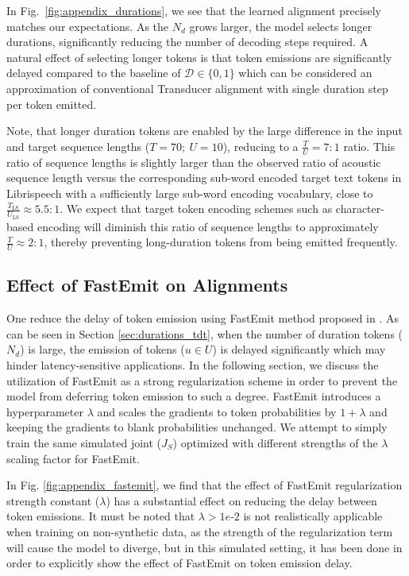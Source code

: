 \documentclass{article}
\begin{document}
In Fig.~\ref{fig:appendix_durations}, we see that the learned alignment precisely matches our expectations. As the $N_d$ grows larger, the model selects longer durations, significantly reducing the number of decoding steps required. A natural effect of selecting longer tokens is that token emissions are significantly delayed compared to the baseline of $\mathcal{D} \in \{ 0, 1 \}$ which can be considered an approximation of conventional Transducer alignment with single duration step per token emitted. 

Note, that longer duration tokens are enabled by the large difference in the input and target sequence lengths ($T = 70; \: U = 10$), reducing to a $\frac{T}{U} = 7:1$ ratio. This ratio of sequence lengths is slightly larger than the observed ratio of acoustic sequence length versus the corresponding sub-word encoded target text tokens in Librispeech with a sufficiently large sub-word encoding vocabulary, close to $\frac{T_\text{LS}}{U_\text{LS}} \approx 5.5:1$. We expect that target token encoding schemes such as character-based encoding will diminish this ratio of sequence lengths to approximately $\frac{T}{U} \approx 2:1$, thereby preventing long-duration tokens from being emitted frequently. 

\vspace{-4pt}
\subsection{Effect of FastEmit on Alignments}
\label{sec:fastemit_tdt}
One reduce the delay of token emission using FastEmit method proposed in \cite{yu2021fastemit}. 
As can be seen in Section \ref{sec:durations_tdt}, when the number of duration tokens ($N_d$) is large, the emission of tokens ($u \in U$) is delayed significantly which may hinder latency-sensitive applications. In the following section, we discuss the utilization of FastEmit \cite{yu2021fastemit} as a strong regularization scheme in order to prevent the model from deferring token emission to such a degree.
FastEmit introduces a hyperparameter $\lambda$ and scales the gradients to token probabilities by $1 + \lambda$ and keeping the gradients to blank probabilities unchanged. We attempt to simply train the same simulated joint ($J_S$) optimized with different strengths of the $\lambda$ scaling factor for FastEmit.

In Fig. \ref{fig:appendix_fastemit}, we find that the effect of FastEmit regularization strength constant ($\lambda$) has a substantial effect on reducing the delay between token emissions. It must be noted that $\lambda > 1e\textit{-}2$ is not realistically applicable when training on non-synthetic data, as the strength of the regularization term will cause the model to diverge, but in this simulated setting, it has been done in order to explicitly show the effect of FastEmit on token emission delay.
\end{document}
